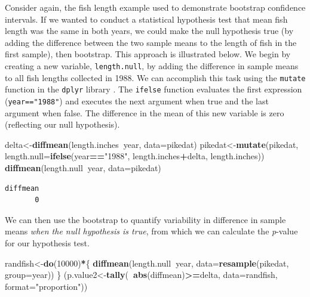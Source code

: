 \documentclass[fleqn,10pt]{wlpeerj} %
\newenvironment{Shaded}{\begin{snugshade}}{\end{snugshade}}
\newcommand{\DataTypeTok}[1]{\textcolor[rgb]{0.13,0.29,0.53}{#1}}
\newcommand{\DecValTok}[1]{\textcolor[rgb]{0.00,0.00,0.81}{#1}}
\newcommand{\KeywordTok}[1]{\textcolor[rgb]{0.13,0.29,0.53}{\textbf{#1}}}
\newcommand{\NormalTok}[1]{#1}
\newcommand{\OperatorTok}[1]{\textcolor[rgb]{0.81,0.36,0.00}{\textbf{#1}}}
\newcommand{\StringTok}[1]{\textcolor[rgb]{0.31,0.60,0.02}{#1}}
\begin{document}
Consider again, the fish length example used to demonstrate bootstrap confidence intervals. If we wanted to conduct a statistical hypothesis test that mean fish length was the same in both years, we could make the null hypothesis true (by adding the difference between the two sample means to the length of fish in the first sample), then bootstrap. This approach is illustrated below. We begin by creating a new variable, \texttt{length.null}, by adding the difference in sample means to all fish lengths collected in 1988. We can accomplish this task using the \texttt{mutate} function in the \texttt{dplyr} library \citep{dplyr}. The \texttt{ifelse} function evaluates the first expression (\texttt{year=="1988"}) and executes the next argument when true and the last argument when false. The difference in the mean of this new variable is zero (reflecting our null hypothesis).

\begin{Shaded}
\begin{Highlighting}[]
\NormalTok{delta<-}\KeywordTok{diffmean}\NormalTok{(length.inches}\OperatorTok{~}\NormalTok{year, }\DataTypeTok{data=}\NormalTok{pikedat)}
\NormalTok{pikedat<-}\KeywordTok{mutate}\NormalTok{(pikedat, }
                 \DataTypeTok{length.null=}\KeywordTok{ifelse}\NormalTok{(year}\OperatorTok{==}\StringTok{"1988"}\NormalTok{, length.inches}\OperatorTok{+}\NormalTok{delta,}
\NormalTok{                                    length.inches))}
\KeywordTok{diffmean}\NormalTok{(length.null}\OperatorTok{~}\NormalTok{year, }\DataTypeTok{data=}\NormalTok{pikedat)}
\end{Highlighting}
\end{Shaded}

\begin{verbatim}
diffmean 
       0 
\end{verbatim}

We can then use the bootstrap to quantify variability in difference in sample means \emph{when the null hypothesis is true}, from which we can calculate the \emph{p}-value for our hypothesis test.

\begin{Shaded}
\begin{Highlighting}[]
\NormalTok{randfish<-}\KeywordTok{do}\NormalTok{(}\DecValTok{10000}\NormalTok{)}\OperatorTok{*}\NormalTok{\{}
  \KeywordTok{diffmean}\NormalTok{(length.null}\OperatorTok{~}\NormalTok{year, }\DataTypeTok{data=}\KeywordTok{resample}\NormalTok{(pikedat, }\DataTypeTok{group=}\NormalTok{year))}
\NormalTok{\}  }
\NormalTok{(p.value2<-}\KeywordTok{tally}\NormalTok{(}\OperatorTok{~}\KeywordTok{abs}\NormalTok{(diffmean)}\OperatorTok{>=}\NormalTok{delta, }\DataTypeTok{data=}\NormalTok{randfish, }\DataTypeTok{format=}\StringTok{"proportion"}\NormalTok{))}
\end{Highlighting}
\end{Shaded}
\end{document}
